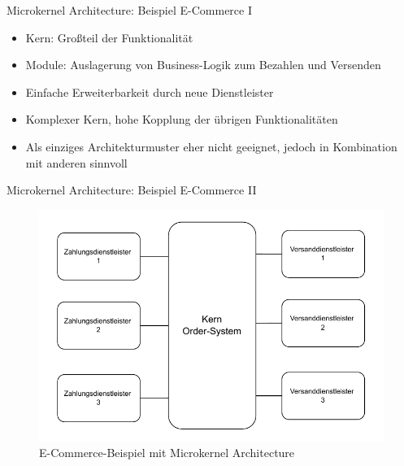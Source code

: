 \begin{frame}{Microkernel Architecture: Beispiel E-Commerce I}
    \begin{itemize}
        \item Kern: Großteil der Funktionalität
        \item Module: Auslagerung von Business-Logik zum Bezahlen und Versenden
        \item Einfache Erweiterbarkeit durch neue Dienstleister
        \item Komplexer Kern, hohe Kopplung der übrigen Funktionalitäten
        \item Als einziges Architekturmuster eher nicht geeignet, jedoch in Kombination mit anderen sinnvoll
    \end{itemize}
\end{frame}

\begin{frame}{Microkernel Architecture: Beispiel E-Commerce II}
    \begin{figure}[!h]
        \centering
        \includegraphics[scale=0.55]{imglib/microkernel/ecommerce-microkernel}
        \caption{E-Commerce-Beispiel mit Microkernel Architecture}
        \label{fig:microkernel-ecommerce}
    \end{figure}
\end{frame}

